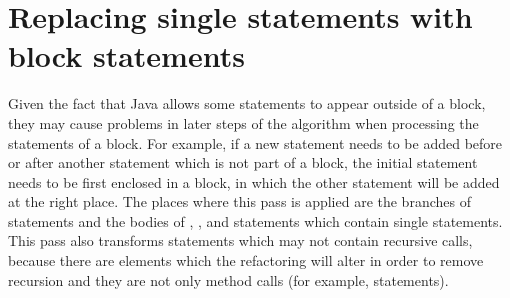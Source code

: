 \section{Replacing single statements with block statements}

Given the fact that Java allows some statements to appear outside of a block, they may cause problems in later steps of
the algorithm when processing the statements of a block. For example, if a new statement needs to be added before or
after another statement which is not part of a block, the initial statement needs to be first enclosed in a block, in
which the other statement will be added at the right place. The places where this pass is applied are the branches of
 statements and the bodies of , ,  and  statements
which contain single statements. This pass also transforms statements which may not contain recursive calls, because
there are elements which the refactoring will alter in order to remove recursion and they are not only method calls (for
example,  statements).
